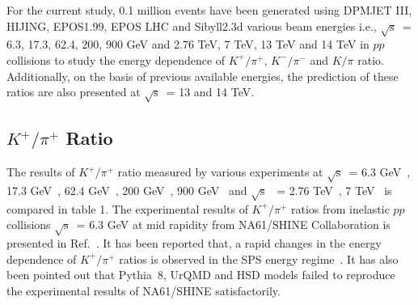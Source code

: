 \documentclass{article}
\newcommand{\sqrts}{\mbox{$\sqrt{\mathrm{s}}$}}
\begin{document}
For the current study, 0.1 million events have been generated using DPMJET III, HIJING, EPOS1.99, EPOS LHC and Sibyll2.3d various beam energies i.e., \sqrts~= 6.3, 17.3, 62.4, 200, 900 GeV and 2.76 TeV, 7 TeV, 13 TeV and 14 TeV in $pp$ collisions to study the energy dependence of $K^+/\pi^+$, $K^-/\pi^-$ and $K/\pi$ ratio. Additionally, on the basis of previous available energies, the prediction of these ratios are also presented at \sqrts~= 13 and 14 TeV. 



\subsection{$K^+/\pi^+$ Ratio}



The results of $K^+/\pi^+$ ratio measured by various experiments at \sqrts~= 6.3 GeV~\cite{Pulawski:2015tka}, 17.3 GeV~\cite{NA49:2009brx}, 62.4 GeV~\cite{PHENIX:2011rvu}, 200 GeV~\cite{STAR:2008med}, 900 GeV~\cite{ALICE:2011gmo} and \sqrts~ = 2.76 TeV~\cite{ALICE:2015ial}, 7 TeV~\cite{ALICE:2015ial} is compared in table 1. The experimental results of $K^+/\pi^+$ ratios from inelastic $pp$ collisions \sqrts~= 6.3 GeV at mid rapidity from NA61/SHINE Collaboration is presented in Ref.~\cite{Pulawski:2015tka}. It has been reported that, a rapid changes in the energy dependence of $K^+/\pi^+$ ratios is observed in the SPS energy regime~\cite{Pulawski:2015tka}. It has also been pointed out that Pythia~8, UrQMD and HSD models failed to reproduce the experimental results of NA61/SHINE satisfactorily.           
\end{document}
